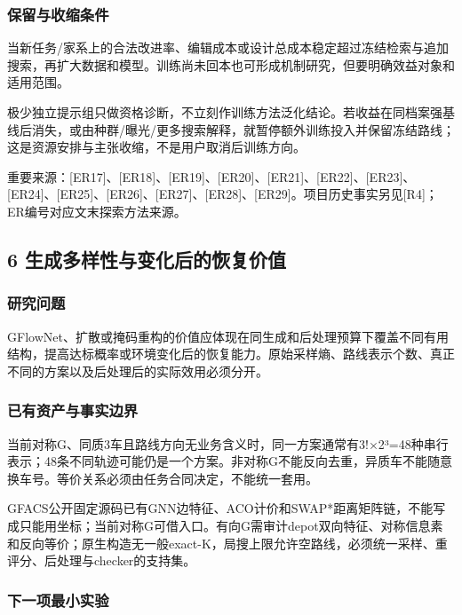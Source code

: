 \documentclass[11pt,a4paper]{article}
\newcommand{\bodytext}[1]{#1\par}
\newcommand{\sourcetext}[1]{{\fontsize{9.2}{14}\selectfont\color{Muted}#1\par}}
\begin{document}
\subsubsection{保留与收缩条件}
\bodytext{当新任务/\allowbreak{}家系上的合法改进率、编辑成本或设计总成本稳定超过冻结检索与追加搜索，再扩大数据和模型。训练尚未回本也可形成机制研究，但要明确效益对象和适用范围。}
\bodytext{极少独立提示组只做资格诊断，不立刻作训练方法泛化结论。若收益在同档案强基线后消失，或由种群/\allowbreak{}曝光/\allowbreak{}更多搜索解释，就暂停额外训练投入并保留冻结路线；这是资源安排与主张收缩，不是用户取消后训练方向。}
\sourcetext{重要来源：[ER17]、[ER18]、[ER19]、[ER20]、[ER21]、[ER22]、[ER23]、[ER24]、[ER25]、[ER26]、[ER27]、[ER28]、[ER29]。项目历史事实另见[R4]；ER编号对应文末探索方法来源。}
\subsection{6  生成多样性与变化后的恢复价值}
\subsubsection{研究问题}
\bodytext{GFlowNet、扩散或掩码重构的价值应体现在同生成和后处理预算下覆盖不同有用结构，提高达标概率或环境变化后的恢复能力。原始采样熵、路线表示个数、真正不同的方案以及后处理后的实际效用必须分开。}
\subsubsection{已有资产与事实边界}
\bodytext{当前对称G、同质3车且路线方向无业务含义时，同一方案通常有3!×2³=48种串行表示；48条不同轨迹可能仍是一个方案。非对称G不能反向去重，异质车不能随意换车号。等价关系必须由任务合同决定，不能统一套用。}
\bodytext{GFACS公开固定源码已有GNN边特征、ACO计价和SWAP*距离矩阵链，不能写成只能用坐标；当前对称G可借入口。有向G需审计depot双向特征、对称信息素和反向等价；原生构造无一般exact-K，局搜上限允许空路线，必须统一采样、重评分、后处理与checker的支持集。}
\subsubsection{下一项最小实验}
\end{document}
